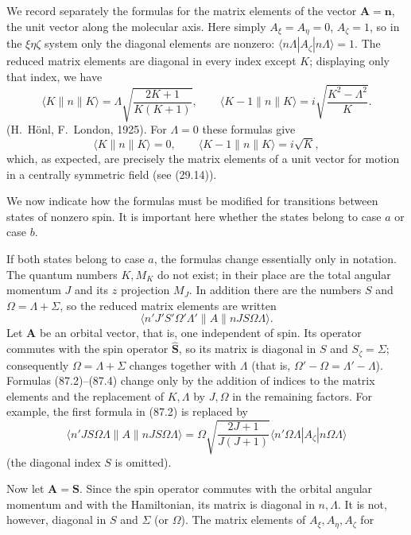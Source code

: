 We record separately the formulas for the matrix elements of the vector $\mathbf A=\mathbf n$, the unit vector along the molecular axis. Here simply $A_\xi=A_\eta=0$, $A_\zeta=1$, so in the $\xi\eta\zeta$ system only the diagonal elements are nonzero: $\langle n\Lambda|A_\zeta|n\Lambda\rangle=1$. The reduced matrix elements are diagonal in every index except $K$; displaying only that index, we have
\begin{equation}
\langle K\|n\|K\rangle=\Lambda\sqrt{\frac{2K+1}{K(K+1)}},\qquad
\langle K-1\|n\|K\rangle=i\sqrt{\frac{K^2-\Lambda^2}{K}}.
\tag{87.4}
\end{equation}
(H.~Hönl, F.~London, 1925). For $\Lambda=0$ these formulas give
\[
\langle K\|n\|K\rangle=0,\qquad \langle K-1\|n\|K\rangle=i\sqrt K,
\]
which, as expected, are precisely the matrix elements of a unit vector for motion in a centrally symmetric field (see (29.14)).

We now indicate how the formulas must be modified for transitions between states of nonzero spin. It is important here whether the states belong to case $a$ or case $b$.

If both states belong to case $a$, the formulas change essentially only in notation. The quantum numbers $K,M_K$ do not exist; in their place are the total angular momentum $J$ and its $z$ projection $M_J$. In addition there are the numbers $S$ and $\Omega=\Lambda+\Sigma$, so the reduced matrix elements are written
\[
\langle n'J'S'\Omega'\Lambda'\|A\|nJS\Omega\Lambda\rangle.
\]
Let $\mathbf A$ be an orbital vector, that is, one independent of spin. Its operator commutes with the spin operator $\widehat{\mathbf S}$, so its matrix is diagonal in $S$ and $S_\zeta=\Sigma$; consequently $\Omega=\Lambda+\Sigma$ changes together with $\Lambda$ (that is, $\Omega'-\Omega=\Lambda'-\Lambda$). Formulas (87.2)--(87.4) change only by the addition of indices to the matrix elements and the replacement of $K,\Lambda$ by $J,\Omega$ in the remaining factors. For example, the first formula in (87.2) is replaced by
\[
\langle n'JS\Omega\Lambda\|A\|nJS\Omega\Lambda\rangle
=\Omega\sqrt{\frac{2J+1}{J(J+1)}}\langle n'\Omega\Lambda|A_\zeta|n\Omega\Lambda\rangle
\]
(the diagonal index $S$ is omitted).

Now let $\mathbf A=\mathbf S$. Since the spin operator commutes with the orbital angular momentum and with the Hamiltonian, its matrix is diagonal in $n,\Lambda$. It is not, however, diagonal in $S$ and $\Sigma$ (or $\Omega$). The matrix elements of $A_\xi,A_\eta,A_\zeta$ for

